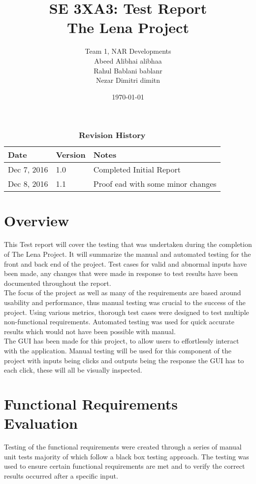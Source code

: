 \documentclass[12pt, titlepage]{article}
\title{SE 3XA3: Test Report\\The Lena Project}
\author{Team 1, NAR Developments
		\\ Abeed Alibhai alibhaa
		\\ Rahul Bablani bablanr
		\\ Nezar Dimitri dimitn
}
\date{\today}
\begin{document}
\maketitle
{}
\tableofcontents
\listoftables
\listoffigures
\begin{table}[bp]
\caption{\bf Revision History}
\begin{tabularx}{\textwidth}{p{3cm}p{2cm}X}
\toprule {\bf Date} & {\bf Version} & {\bf Notes}\\
\midrule
Dec 7, 2016 & 1.0 & Completed Initial Report\\
Dec 8, 2016 & 1.1 & Proof ead with some minor changes\\
\bottomrule
\end{tabularx}
\end{table}
\newpage
{}
\section{Overview}

This Test report will cover the testing that was undertaken during the completion of The Lena Project. It will summarize the manual and automated testing for the front and back end of the project. Test cases for valid and abnormal inputs have been made, any changes that were made in response to test results have been documented throughout the report.\\

The focus of the project as well as many of the requirements are based around usability and performance, thus manual testing was crucial to the success of the project. Using various metrics, thorough test cases were designed to test multiple non-functional requirements. Automated testing was used for quick accurate results which would not have been possible with manual.\\
		
The GUI has been made for this project, to allow users to effortlessly interact with the application. Manual testing will be used for this component of the project with inputs being clicks and outputs being the response the GUI has to each click, these will all be visually inspected.

\section{Functional Requirements Evaluation}
Testing of the functional requirements were created through a series of manual unit tests majority of which follow a black box testing approach. The testing was used to ensure certain functional requirements are met and to verify the correct results occurred after a specific input.
\end{document}
